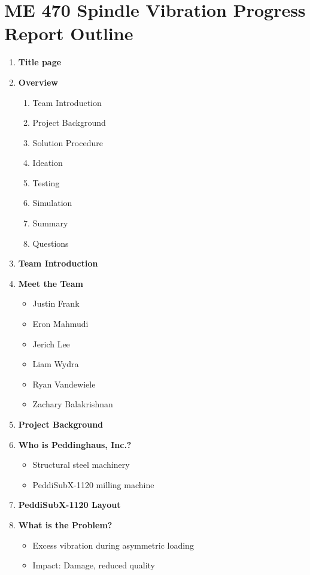 \documentclass[9pt]{article}
\title{}
\author{Jerich Lee}
\date{\today}
\theoremstyle{definition} %
\theoremstyle{plain} %
\begin{document}
\section*{ME 470 Spindle Vibration Progress Report Outline}

\begin{enumerate}
    \item \textbf{Title page}
    \item \textbf{Overview}
    \begin{enumerate}
        \item Team Introduction
        \item Project Background
        \item Solution Procedure
        \item Ideation
        \item Testing
        \item Simulation
        \item Summary
        \item Questions
    \end{enumerate}

    \item \textbf{Team Introduction}
    \item \textbf{Meet the Team} 
    \begin{itemize}
        \item Justin Frank
        \item Eron Mahmudi
        \item Jerich Lee
        \item Liam Wydra
        \item Ryan Vandewiele
        \item Zachary Balakrishnan
    \end{itemize}

    \item \textbf{Project Background}

    \item \textbf{Who is Peddinghaus, Inc.?}
    \begin{itemize}
        \item Structural steel machinery
        \item PeddiSubX-1120 milling machine
    \end{itemize}

    \item \textbf{PeddiSubX-1120 Layout}

    \item \textbf{What is the Problem?}
    \begin{itemize}
        \item Excess vibration during asymmetric loading
        \item Impact: Damage, reduced quality
    \end{itemize}


\end{enumerate}
\end{document}
